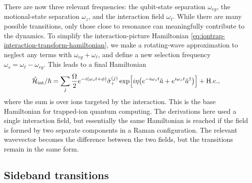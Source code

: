 There are now three relevant frequencies: the qubit-state separation $\omega_{eg}$, the motional-state separation $\omega_z$, and the interaction field $\omega_\ell$.
While there are many possible transitions, only those close to resonance can meaningfully contribute to the dynamics.
To simplify the interaction-picture Hamiltonian \cref{eq:iontrap-interaction-transform-hamiltonian}, we make a rotating-wave approximation to neglect any terms with $\omega_{eg} + \omega_\ell$, and define a new selection frequency $\omega_s = \omega_\ell - \omega_{eg}$.
This leads to a final Hamiltonian
\begin{equation}\label{eq:iontrap-interaction-hamiltonian}
\hat{\mathcal H}_{\text{int}}/\hbar = \sum_j\frac\Omega2 e^{-i(\omega_st + \phi)}\hat{\sigma}_{\mkern-1mu+}^{(j)}\exp\Bigl[i\eta\bigl(e^{-i\omega_zt}\hat{a} + e^{i\omega_zt}\hat{a}^\dagger\bigr)\Bigr] + \text{H.c.},
\end{equation}
where the sum is over ions targeted by the interaction.
This is the base Hamiltonian for trapped-ion quantum computing.
The derivations here used a single interaction field, but essentially the same Hamiltonian is reached if the field is formed by two separate components in a Raman configuration.
The relevant wavevector becomes the difference between the two fields, but the transitions remain in the same form.


\subsection{Sideband transitions}
\label{sec:iontrap-sidebands}

